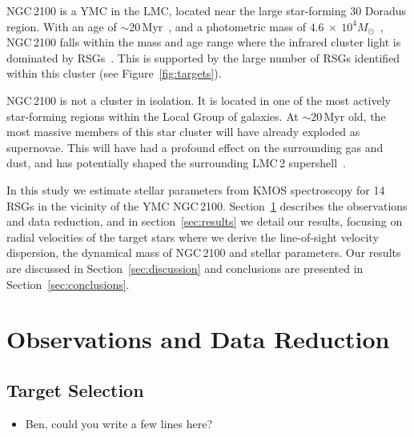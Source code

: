 \documentclass[useAMS,usenatbib]{mn2e}
\begin{document}
NGC\,2100 is a YMC in the LMC, located near the large star-forming 30 Doradus region.
With an age of $\sim$20\,Myr~\citep{1991ApJS...76..185E,2015A&A...575A..62N}, and a photometric mass of $4.6~\times~10^4M_{\odot}$~\citep[assuming~\cite{1966AJ.....71...64K} profiles]{2005ApJS..161..304M}, NGC\,2100 falls within the mass and age range where the infrared cluster light is dominated by RSGs~\citep{2013MNRAS.430L..35G}.
This is supported by the large number of RSGs identified within this cluster (see Figure~\ref{fig:targets}).

NGC\,2100 is not a cluster in isolation.
It is located in one of the most actively star-forming regions within the Local Group of galaxies.
At $\sim$20\,Myr old, the most massive members of this star cluster will have already exploded as supernovae.
This will have had a profound effect on the surrounding gas and dust, and has potentially shaped the surrounding LMC\,2 supershell~\citep[see][]{1999ApJ...518..298P}.

In this study we estimate stellar parameters from KMOS spectroscopy for 14 RSGs in the vicinity of the YMC NGC\,2100.
Section~\ref{sec:observations} describes the observations and data reduction, and in section~\ref{sec:results} we detail our results, focusing on radial velocities of the target stars where we derive the line-of-sight velocity dispersion, the dynamical mass of NGC\,2100 and stellar parameters.
Our results are discussed in Section~\ref{sec:discussion} and conclusions are presented in Section~\ref{sec:conclusions}.


\section{Observations and Data Reduction} %
\label{sec:observations}
\subsection{Target Selection} %
\label{sub:target_selection}

\begin{itemize}
  \item Ben, could you write a few lines here?
\end{itemize}
\end{document}
